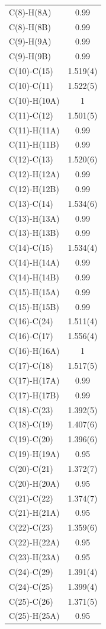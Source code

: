 \begin{center}
{\begin{supertabular}{p{1.5in}c}
C(8)-H(8A) &0.99\\
C(8)-H(8B) &0.99\\
C(9)-H(9A) &0.99\\
C(9)-H(9B) &0.99\\
C(10)-C(15) &1.519(4)\\
C(10)-C(11) &1.522(5)\\
C(10)-H(10A) &1\\
C(11)-C(12) &1.501(5)\\
C(11)-H(11A) &0.99\\
C(11)-H(11B) &0.99\\
C(12)-C(13) &1.520(6)\\
C(12)-H(12A) &0.99\\
C(12)-H(12B) &0.99\\
C(13)-C(14) &1.534(6)\\
C(13)-H(13A) &0.99\\
C(13)-H(13B) &0.99\\
C(14)-C(15) &1.534(4)\\
C(14)-H(14A) &0.99\\
C(14)-H(14B) &0.99\\
C(15)-H(15A) &0.99\\
C(15)-H(15B) &0.99\\
C(16)-C(24) &1.511(4)\\
C(16)-C(17) &1.556(4)\\
C(16)-H(16A) &1\\
C(17)-C(18) &1.517(5)\\
C(17)-H(17A) &0.99\\
C(17)-H(17B) &0.99\\
C(18)-C(23) &1.392(5)\\
C(18)-C(19) &1.407(6)\\
C(19)-C(20) &1.396(6)\\
C(19)-H(19A) &0.95\\
C(20)-C(21) &1.372(7)\\
C(20)-H(20A) &0.95\\
C(21)-C(22) &1.374(7)\\
C(21)-H(21A) &0.95\\
C(22)-C(23) &1.359(6)\\
C(22)-H(22A) &0.95\\
C(23)-H(23A) &0.95\\
C(24)-C(29) &1.391(4)\\
C(24)-C(25) &1.399(4)\\
C(25)-C(26) &1.371(5)\\
C(25)-H(25A) &0.95\\

\end{supertabular}}
\end{center}
